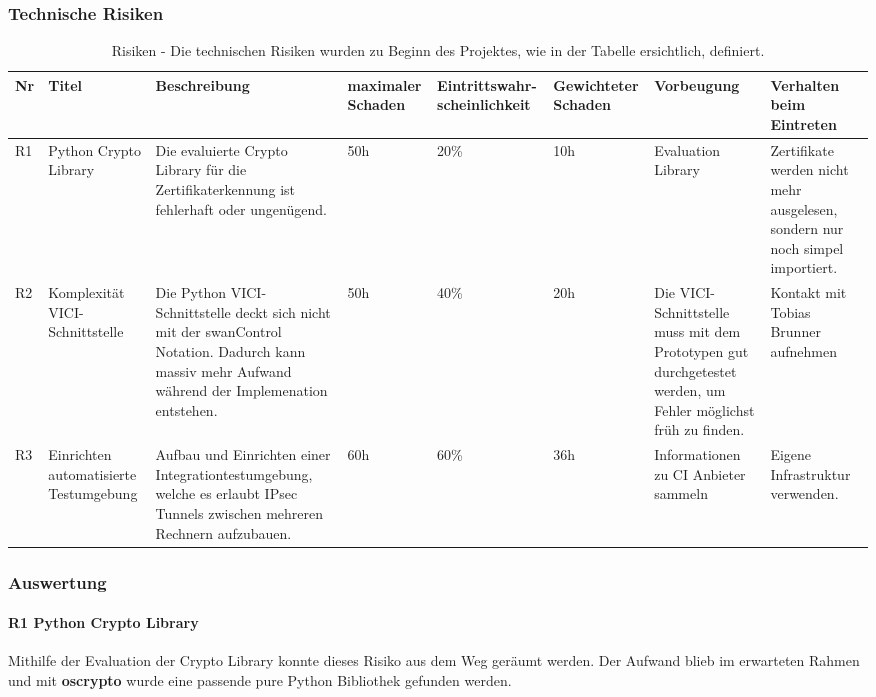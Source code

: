 \begin{landscape}
\subsubsection{Technische Risiken}
\begin{table}[H]
    \begin{tabular}{|p{0.4cm}|p{2.5cm}|p{7cm}|p{1.5cm}|p{2.25cm}|p{1.75cm}|p{3cm}|p{4cm}|}
    \hline    
    \rowcolor{lightblue}
    Nr & Titel & Beschreibung & maximaler Schaden & Eintrittswahr-scheinlichkeit & Gewichteter Schaden & Vorbeugung & Verhalten beim Eintreten \\ \hline
	R1 & Python Crypto Library & Die evaluierte Crypto Library für die Zertifikaterkennung ist fehlerhaft oder ungenügend. & 50h & 20\% & 10h & Evaluation Library & Zertifikate werden nicht mehr ausgelesen, sondern nur noch simpel importiert. \\ \hline
	R2 & Komplexität VICI-Schnittstelle & Die Python VICI-Schnittstelle deckt sich nicht mit der swanControl Notation. Dadurch kann massiv mehr Aufwand während der Implemenation entstehen. & 50h & 40\% & 20h & Die VICI-Schnittstelle muss mit dem Prototypen gut durchgetestet werden, um Fehler möglichst früh zu finden. & Kontakt mit Tobias Brunner aufnehmen \\ \hline
	R3 & Einrichten automatisierte Testumgebung & Aufbau und Einrichten einer Integrationtestumgebung, welche es erlaubt IPsec Tunnels zwischen mehreren Rechnern aufzubauen. & 60h & 60\% & 36h & Informationen zu CI Anbieter sammeln & Eigene Infrastruktur verwenden. \\ \hline
    \end{tabular}
    \caption[Risiken]{Risiken - Die technischen Risiken wurden zu Beginn des Projektes, wie in der Tabelle ersichtlich, definiert.}
\end{table}
\end{landscape}

\subsubsection{Auswertung}
\paragraph{R1 Python Crypto Library} Mithilfe der Evaluation der Crypto Library konnte dieses Risiko aus dem Weg geräumt werden. Der Aufwand blieb im erwarteten Rahmen und mit \textbf{oscrypto} wurde eine passende pure Python Bibliothek gefunden werden.

